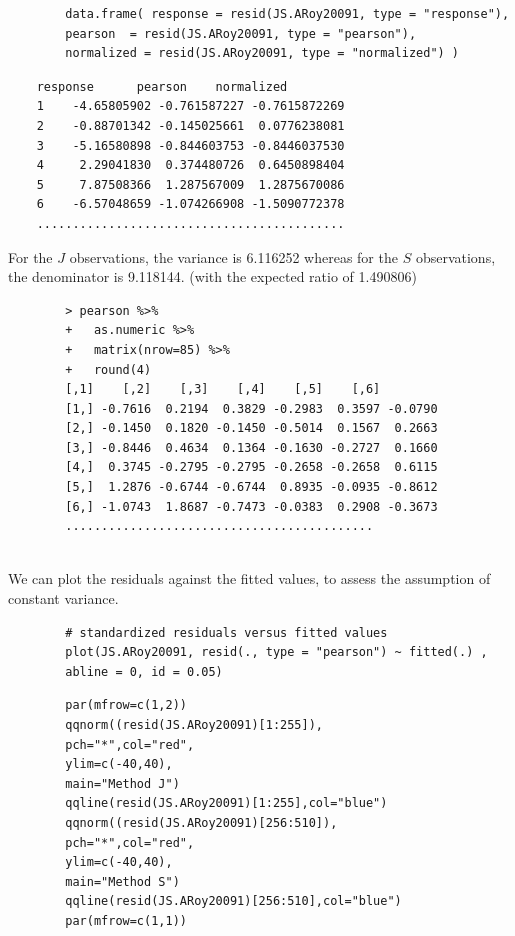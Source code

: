 \documentclass[12pt, a4paper]{report}
\theoremstyle{plain}
\theoremstyle{definition}
\theoremstyle{remark}
\begin{document}
	
	
	\begin{framed}
		\begin{verbatim}
		data.frame( response = resid(JS.ARoy20091, type = "response"), 
		pearson  = resid(JS.ARoy20091, type = "pearson"), 
		normalized = resid(JS.ARoy20091, type = "normalized") )
		\end{verbatim}
	\end{framed}
	
	\begin{verbatim}
	response      pearson    normalized
	1    -4.65805902 -0.761587227 -0.7615872269
	2    -0.88701342 -0.145025661  0.0776238081
	3    -5.16580898 -0.844603753 -0.8446037530
	4     2.29041830  0.374480726  0.6450898404
	5     7.87508366  1.287567009  1.2875670086
	6    -6.57048659 -1.074266908 -1.5090772378
	...........................................
	\end{verbatim}
	For the $J$ observations, the variance is 6.116252 whereas for the $S$ observations, the denominator is 9.118144. (with the expected ratio of  1.490806)
	
	
	\begin{framed}
		\begin{verbatim}
		> pearson %>%
		+   as.numeric %>% 
		+   matrix(nrow=85) %>%
		+   round(4) 
		[,1]    [,2]    [,3]    [,4]    [,5]    [,6]
		[1,] -0.7616  0.2194  0.3829 -0.2983  0.3597 -0.0790
		[2,] -0.1450  0.1820 -0.1450 -0.5014  0.1567  0.2663
		[3,] -0.8446  0.4634  0.1364 -0.1630 -0.2727  0.1660
		[4,]  0.3745 -0.2795 -0.2795 -0.2658 -0.2658  0.6115
		[5,]  1.2876 -0.6744 -0.6744  0.8935 -0.0935 -0.8612
		[6,] -1.0743  1.8687 -0.7473 -0.0383  0.2908 -0.3673
		...........................................
		
		\end{verbatim}
	\end{framed}
	
	We can plot the residuals against the fitted values, to assess the assumption of constant variance. 
	\begin{framed}
		\begin{verbatim}
		# standardized residuals versus fitted values 
		plot(JS.ARoy20091, resid(., type = "pearson") ~ fitted(.) , 
		abline = 0, id = 0.05)
		\end{verbatim}
	\end{framed}
	
	
	\begin{framed}
		\begin{verbatim}
		par(mfrow=c(1,2))
		qqnorm((resid(JS.ARoy20091)[1:255]),
		pch="*",col="red",
		ylim=c(-40,40),
		main="Method J")
		qqline(resid(JS.ARoy20091)[1:255],col="blue")
		qqnorm((resid(JS.ARoy20091)[256:510]),
		pch="*",col="red",
		ylim=c(-40,40),
		main="Method S")
		qqline(resid(JS.ARoy20091)[256:510],col="blue")
		par(mfrow=c(1,1))
		\end{verbatim}	
	\end{framed}
	
\end{document}
